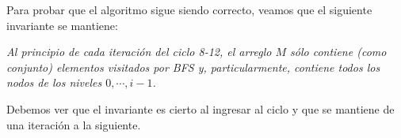 \begin{algorithm}
	\DontPrintSemicolon
 	\BlankLine
\caption{$\textsc{Vectorized-BFS-No-Branching}$}
\label{algo:algoritmo17}
\end{algorithm}

Para probar que el algoritmo sigue siendo correcto, veamos que el siguiente invariante se mantiene:

\begin{center}
\emph{
	Al principio de cada iteración del ciclo 8-12, el arreglo $M$ sólo contiene (como conjunto) elementos visitados por BFS y, particularmente, contiene todos los nodos de los niveles $0, \cdots, i - 1$.
}
\end{center}

Debemos ver que el invariante es cierto al ingresar al ciclo y que se mantiene de una iteración a la siguiente.

